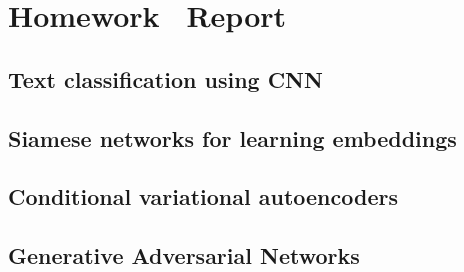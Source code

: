\documentclass[12pt]{article}
\begin{document}
\section{Homework \thesection\ Report}
\subsection{Text classification using CNN}
\subsection{Siamese networks for learning embeddings}
\subsection{Conditional variational autoencoders}
\subsection{Generative Adversarial Networks}
\end{document}
